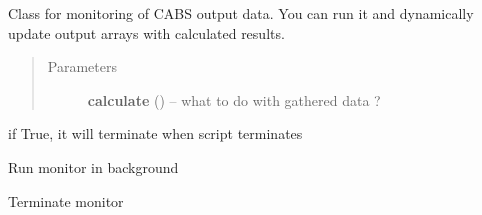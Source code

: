 \documentclass[letterpaper,10pt,english]{sphinxmanual}
\begin{document}
\begin{fulllineitems}
\label{index:pycabs.Monitor}
Class for monitoring of CABS output data. You can run it and dynamically update output arrays with calculated results.
\begin{quote}\begin{description}
\item[{Parameters}] \leavevmode
\textbf{calculate} ({\hyperref[index:pycabs.Calculate]{}}) -- what to do with gathered data ?

\end{description}\end{quote}

\begin{fulllineitems}
\label{index:pycabs.Monitor.daemon}
if True, it will terminate when script terminates

\end{fulllineitems}


\begin{fulllineitems}
\label{index:pycabs.Monitor.run}
Run monitor in background

\end{fulllineitems}


\begin{fulllineitems}
\label{index:pycabs.Monitor.terminate}
Terminate monitor

\end{fulllineitems}


\end{fulllineitems}

\end{document}
